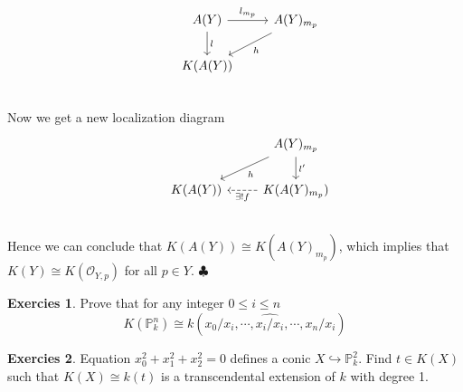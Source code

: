 \documentclass[12pt,a4paper]{article}
\theoremstyle{definition}
\newtheorem{exer}{Exercies}[subsection]
\newcommand*{\qeds}{\hfill\ensuremath{\clubsuit}}
\begin{document}
\[
\begin{tikzcd}
&A(Y) \ar[r,"l_{m_p}"] \ar[d,"l"]& A(Y)_{m_p} \ar[ld,"h"] \\
&K(A(Y))& \\
\end{tikzcd}
\]
Now we get a new localization diagram
\[
\begin{tikzcd}
& &A(Y)_{m_p} \ar[d,"l'"] \ar[dl,"h"]\\
&K(A(Y)) & K(A(Y)_{m_p}) \ar[l,dashed,"\exists !f"]\\
\end{tikzcd}
\]
Hence we can conclude that $K(A(Y)) \cong K(A(Y)_{m_p})$, which implies that $K(Y) \cong K(\mathcal{O}_{Y,p})$ for all $p \in Y$. \qeds
\begin{exer}
	Prove that for any integer $0 \leq i \leq n$
	\[
	K(\mathbb{P}^n_k) \cong k(x_0/x_i, \cdots, \widehat{x_i/x_i}, \cdots, x_n/x_i)
	\]
\end{exer}
\begin{exer}
	Equation $x_0^2 + x_1^2 + x_2^2=0$ defines a conic $X \hookrightarrow \mathbb{P}_k^2$. Find $t \in K(X)$ such that $K(X) \cong k(t)$ is a transcendental extension of $k$ with degree 1.
\end{exer}
\end{document}
